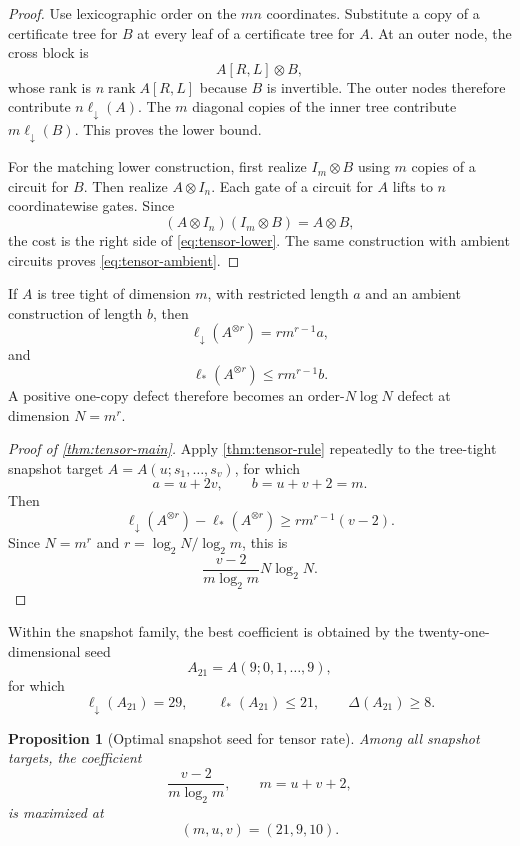 \documentclass[11pt]{amsart}
\numberwithin{equation}{section}
\newtheorem{proposition}[theorem]{Proposition}
\theoremstyle{definition}
\theoremstyle{remark}
\newcommand{\rank}{\operatorname{rank}}
\newcommand{\ellDown}{\ell_{\downarrow}}
\newcommand{\ellAll}{\ell_{*}}
\newcommand{\DeltaDef}{\Delta}
\begin{document}
\begin{proof}
Use lexicographic order on the $mn$ coordinates.  Substitute a copy of a certificate tree for $B$ at every leaf of a certificate tree for $A$.  At an outer node, the cross block is
\[
A[R,L]\otimes B,
\]
whose rank is $n\rank A[R,L]$ because $B$ is invertible.  The outer nodes therefore contribute $n\ellDown(A)$.  The $m$ diagonal copies of the inner tree contribute $m\ellDown(B)$.  This proves the lower bound.

For the matching lower construction, first realize $I_m\otimes B$ using $m$ copies of a circuit for $B$.  Then realize $A\otimes I_n$.  Each gate of a circuit for $A$ lifts to $n$ coordinatewise gates.  Since
\[
(A\otimes I_n)(I_m\otimes B)=A\otimes B,
\]
the cost is the right side of \cref{eq:tensor-lower}.  The same construction with ambient circuits proves \cref{eq:tensor-ambient}.
\end{proof}

If $A$ is tree tight of dimension $m$, with restricted length $a$ and an ambient construction of length $b$, then
\begin{equation}\label{eq:tensor-power-lower}
\ellDown(A^{\otimes r})
=
r m^{r-1}a,
\end{equation}
and
\begin{equation}\label{eq:tensor-power-upper}
\ellAll(A^{\otimes r})
\le
r m^{r-1}b.
\end{equation}
A positive one-copy defect therefore becomes an order-$N\log N$ defect at dimension $N=m^r$.

\begin{proof}[Proof of \cref{thm:tensor-main}]
Apply \cref{thm:tensor-rule} repeatedly to the tree-tight snapshot target $A=A(u;s_1,\ldots,s_v)$, for which
\[
a=u+2v,
\qquad
b=u+v+2=m.
\]
Then
\[
\ellDown(A^{\otimes r})
-
\ellAll(A^{\otimes r})
\ge
r m^{r-1}(v-2).
\]
Since $N=m^r$ and $r=\log_2N/\log_2m$, this is
\[
\frac{v-2}{m\log_2m}N\log_2N.
\]
\end{proof}

Within the snapshot family, the best coefficient is obtained by the twenty-one-dimensional seed
\[
A_{21}=A(9;0,1,\ldots,9),
\]
for which
\[
\ellDown(A_{21})=29,
\qquad
\ellAll(A_{21})\le21,
\qquad
\DeltaDef(A_{21})\ge8.
\]

\begin{proposition}[Optimal snapshot seed for tensor rate]\label{prop:optimal-snapshot-seed}
Among all snapshot targets, the coefficient
\[
\frac{v-2}{m\log_2m},
\qquad m=u+v+2,
\]
is maximized at
\[
(m,u,v)=(21,9,10).
\]
\end{proposition}
\end{document}
